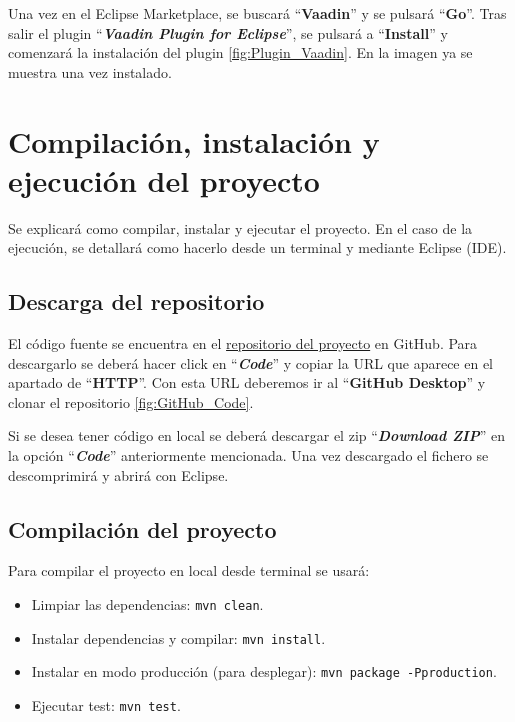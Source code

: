 
Una vez en el Eclipse Marketplace, se buscará ``\textbf{Vaadin}'' y se pulsará ``\textbf{Go}''. Tras salir el plugin ``\textbf{\textit{Vaadin Plugin for Eclipse}}'', se pulsará a ``\textbf{Install}'' y comenzará la instalación del plugin \ref{fig:Plugin_Vaadin}. En la imagen ya se muestra una vez instalado.


\section{Compilación, instalación y ejecución del proyecto}

Se explicará como compilar, instalar y ejecutar el proyecto. En el caso de
la ejecución, se detallará como hacerlo desde un terminal y mediante Eclipse (IDE).

\subsection{Descarga del repositorio}
El código fuente se encuentra en el \href{https://github.com/drg1006/Gestor-TFG-2022.git}{repositorio del proyecto} en GitHub. Para descargarlo se deberá hacer click en ``\textbf{\textit{Code}}'' y copiar la URL que aparece en el apartado de ``\textbf{HTTP}''. Con esta URL deberemos ir al ``\textbf{GitHub Desktop}'' y clonar el repositorio \ref{fig:GitHub_Code}.


Si se desea tener código en local se deberá descargar el zip ``\textbf{\textit{Download ZIP}}'' en la opción ``\textbf{\textit{Code}}'' anteriormente mencionada. Una vez descargado el fichero se descomprimirá y abrirá con Eclipse. 

\subsection{Compilación del proyecto}

Para compilar el proyecto en local desde terminal se usará:
\begin{itemize}
	\item Limpiar las dependencias: \texttt{mvn clean}.
	\item Instalar dependencias y compilar: \texttt{mvn install}.
	\item Instalar en modo producción (para desplegar): \texttt{mvn package -Pproduction}.  
	\item Ejecutar test: \texttt{mvn test}.	
\end{itemize}

